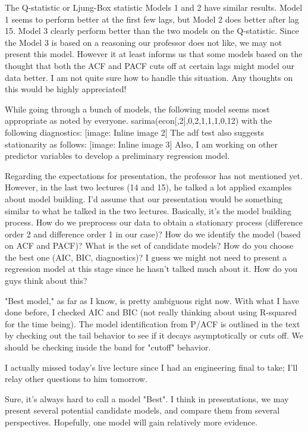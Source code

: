 \documentclass[twoside,twocolumn]{article}
\begin{document}
The Q-statistic or Ljung-Box statistic
Models 1 and 2 have similar results. Model 1 seems to perform better at the first few lags, but Model 2 does better after lag 15. Model 3 clearly perform better than the two models on the Q-statistic. Since the Model 3 is based on a reasoning our professor does not like, we may not present this model. However it at least informs us that some models based on the thought that both the ACF and PACF cuts off at certain lags might model our data better. I am not quite sure how to handle this situation. Any thoughts on this would be highly appreciated!

While going through a bunch of models, the following model seems most appropriate as noted by everyone. sarima(econ[,2],0,2,1,1,1,0,12) with the following diagnostics: [image: Inline image 2] The adf test also suggests stationarity as follows: [image: Inline image 3] Also, I am working on other predictor variables to develop a preliminary regression model.

Regarding the expectations for presentation, the professor has not
mentioned yet. However, in the last two lectures (14 and 15), he talked a
lot applied examples about model building. I'd assume that our presentation
would be something similar to what he talked in the two lectures.
Basically, it's the model building process. How do we preprocess our data
to obtain a stationary process (difference order 2 and difference order 1
in our case)? How do we identify the model (based on ACF and PACF)? What is
the set of candidate models? How do you choose the best one (AIC, BIC,
diagnostics)? I guess we might not need to present a regression model at
this stage since he hasn't talked much about it. How do you guys think
about this?



"Best model," as far as I know, is pretty ambiguous right now. With what I have done before, I checked AIC and BIC (not really thinking about using R-squared for the time being). The model identification from P/ACF is outlined in the text by checking out the tail behavior to see if it decays asymptotically or cuts off. We should be checking inside the band for "cutoff" behavior.

I actually missed today's live lecture since I had an engineering final to take; I'll relay other questions to him tomorrow.


Sure, it's always hard to call a model "Best". I think in presentations, we
may present several potential candidate models, and compare them from
several perspectives. Hopefully, one model will gain relatively more
evidence.
\end{document}
